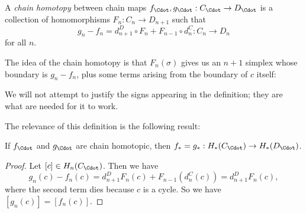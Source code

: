 \documentclass[a4paper]{article}
\begin{document}
\begin{defi}
  A \emph{chain homotopy} between chain maps $f_{\Cdot}, g_{\Cdot}: C_{\Cdot} \to D_{\Cdot}$ is a collection of homomorphisms $F_n: C_n \to D_{n + 1}$ such that
  \[
    g_n - f_n = d_{n + 1}^D \circ F_n + F_{n - 1} \circ d_n^C: C_n \to D_n
  \]
  for all $n$.
\end{defi}
The idea of the chain homotopy is that $F_n(\sigma)$ gives us an $n + 1$ simplex whose boundary is $g_n - f_n$, plus some terms arising from the boundary of $c$ itself:
\begin{center}
\end{center}
We will not attempt to justify the signs appearing in the definition; they are what are needed for it to work.

The relevance of this definition is the following result:
\begin{lemma}
  If $f_{\Cdot}$ and $g_{\Cdot}$ are chain homotopic, then $f_* = g_*: H_*(C_{\Cdot}) \to H_*(D_{\Cdot})$.
\end{lemma}

\begin{proof}
  Let $[c] \in H_n(C_{\Cdot})$. Then we have
  \[
    g_n(c) - f_n(c) = d_{n + 1}^DF_n(c) + F_{n - 1}(d_n^C(c)) = d_{n + 1}^DF_n(c),
  \]
  where the second term dies because $c$ is a cycle. So we have $[g_n(c)] = [f_n(c)]$.
\end{proof}
\end{document}
